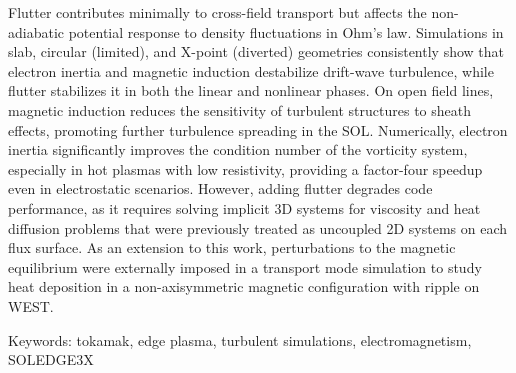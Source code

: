 Flutter contributes minimally to cross-field transport but affects the non-adiabatic potential response to density fluctuations in Ohm's law. Simulations in slab, circular (limited), and X-point (diverted) geometries consistently show that electron inertia and magnetic induction destabilize drift-wave turbulence, while flutter stabilizes it in both the linear and nonlinear phases. On open field lines, magnetic induction reduces the sensitivity of turbulent structures to sheath effects, promoting further turbulence spreading in the SOL. Numerically, electron inertia significantly improves the condition number of the vorticity system, especially in hot plasmas with low resistivity, providing a factor-four speedup even in electrostatic scenarios. However, adding flutter degrades code performance, as it requires solving implicit 3D systems for viscosity and heat diffusion problems that were previously treated as uncoupled 2D systems on each flux surface. As an extension to this work, perturbations to the magnetic equilibrium were externally imposed in a transport mode simulation to study heat deposition in a non-axisymmetric magnetic configuration with ripple on WEST.

\vspace{0.5cm}
Keywords: tokamak, edge plasma, turbulent simulations, electromagnetism, SOLEDGE3X
